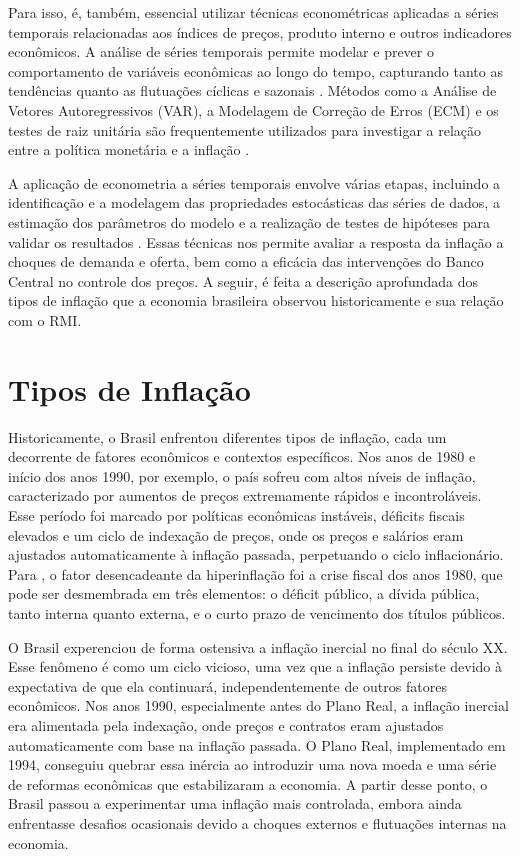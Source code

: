 \documentclass[12pt,oneside,a4paper,chapter=TITLE,english,brazil,sumario=abnt-6027-2012]{abntex2}
\begin{document}
Para isso, é, também, essencial utilizar técnicas econométricas aplicadas a séries temporais relacionadas aos índices de preços, produto interno e outros indicadores econômicos. A análise de séries temporais permite modelar e prever o comportamento de variáveis econômicas ao longo do tempo, capturando tanto as tendências quanto as flutuações cíclicas e sazonais \cite{enders_2015_applied}. Métodos como a Análise de Vetores Autoregressivos (VAR), a Modelagem de Correção de Erros (ECM) e os testes de raiz unitária são frequentemente utilizados para investigar a relação entre a política monetária e a inflação \cite{hamilton_2020_time}.

A aplicação de econometria a séries temporais envolve várias etapas, incluindo a identificação e a modelagem das propriedades estocásticas das séries de dados, a estimação dos parâmetros do modelo e a realização de testes de hipóteses para validar os resultados \cite{stock_2020_introduction}. Essas técnicas nos permite avaliar a resposta da inflação a choques de demanda e oferta, bem como a eficácia das intervenções do Banco Central no controle dos preços. A seguir, é feita a descrição aprofundada dos tipos de inflação que a economia brasileira observou historicamente e sua relação com o RMI.

\chapter{Tipos de Inflação}

Historicamente, o Brasil enfrentou diferentes tipos de inflação, cada um decorrente de fatores econômicos e contextos específicos. Nos anos de 1980 e início dos anos 1990, por exemplo, o país sofreu com altos níveis de inflação, caracterizado por aumentos de preços extremamente rápidos e incontroláveis. Esse período foi marcado por políticas econômicas instáveis, déficits fiscais elevados e um ciclo de indexação de preços, onde os preços e salários eram ajustados automaticamente à inflação passada, perpetuando o ciclo inflacionário. Para , o fator desencadeante da hiperinflação foi a crise fiscal dos anos 1980, que pode ser desmembrada em três elementos: o déficit público, a dívida pública, tanto interna quanto externa, e o curto prazo de vencimento dos títulos públicos.


O Brasil experenciou de forma ostensiva a inflação inercial no final do século XX. Esse fenômeno é como um ciclo vicioso, uma vez que a inflação persiste devido à expectativa de que ela continuará, independentemente de outros fatores econômicos. Nos anos 1990, especialmente antes do Plano Real, a inflação inercial era alimentada pela indexação, onde preços e contratos eram ajustados automaticamente com base na inflação passada. O Plano Real, implementado em 1994, conseguiu quebrar essa inércia ao introduzir uma nova moeda e uma série de reformas econômicas que estabilizaram a economia. A partir desse ponto, o Brasil passou a experimentar uma inflação mais controlada, embora ainda enfrentasse desafios ocasionais devido a choques externos e flutuações internas na economia.
\end{document}
